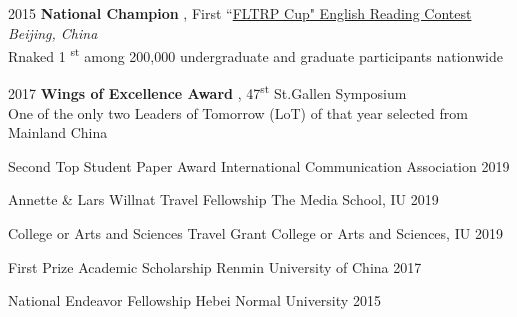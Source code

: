 
\begin{rSection}{}
{\hspace{-0.5em}2015\hspace{1em}}{\bodyfont\bfseries\color{darktext} {National Champion}}{ , First ``\href{http://uchallenge.unipus.cn/2018/constitution/reading/447651.shtml}{FLTRP Cup" English Reading Contest}
} \hfill{\bodyfont\slshape\color{awesome} {Beijing, China}}
\\Rnaked 1 \textsuperscript{st} among 200,000 undergraduate and graduate participants nationwide
\end{rSection}

\begin{rSection}{}
{\vspace{-0.4em}\hspace{-0.5em}2017\hspace{1em}}{\bodyfont\bfseries\color{darktext} {Wings of Excellence Award}}{ , 47\textsuperscript{st} St.Gallen Symposium} \hfill{}
\\One of the only two Leaders of Tomorrow (LoT) of that year selected from Mainland China \vspace{-0.5em}
\end{rSection}

\begin{cvhonors}

  \cvhonor
    {Second Top Student Paper Award} %
    {International Communication Association} %
    {\hspace{-2em}} %
    {2019} %
    
    
  \cvhonor
    {Annette \& Lars Willnat Travel Fellowship} %
    {The Media School, IU} %
    {} %
    {2019} %

  \cvhonor
    {College or Arts and Sciences Travel Grant} %
    {College or Arts and Sciences, IU} %
    {} %
    {2019} %

  \cvhonor
    {First Prize Academic Scholarship} %
    {Renmin University of China} %
    {} %
    {2017} %

  \cvhonor
    {National Endeavor Fellowship} %
    {Hebei Normal University} %
    {\hspace{-2em} } %
    {2015} %

\end{cvhonors}


